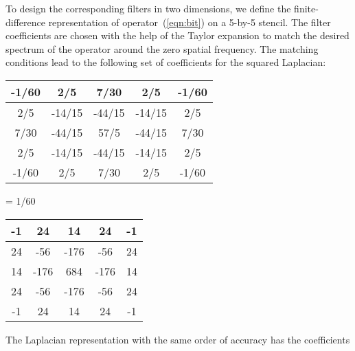 


To design the corresponding filters in two dimensions, we define the
finite-difference representation of operator~(\ref{eqn:bit}) on a
5-by-5 stencil. The filter coefficients are chosen with the help of
the Taylor expansion to match the desired spectrum of the operator
around the zero spatial frequency.  The matching conditions lead to
the following set of coefficients for the squared Laplacian:
\begin{center}
\begin{tabular}{|c|c|c|c|c|}
\hline 
-1/60 & 2/5 & 7/30 & 2/5 & -1/60 \\
\hline
2/5 & -14/15 & -44/15 & -14/15 & 2/5 \\
\hline
7/30 & -44/15 & 57/5 & -44/15 & 7/30 \\
\hline
2/5 & -14/15 & -44/15 & -14/15 & 2/5 \\
\hline
-1/60 & 2/5 & 7/30 & 2/5 & -1/60 \\
\hline
\end{tabular}
= 1/60
\begin{tabular}{|c|c|c|c|c|}
\hline 
-1 & 24 & 14 & 24 & -1 \\
\hline
24 & -56 & -176 & -56 & 24 \\
\hline
14 & -176 & 684 & -176 & 14 \\
\hline
24 & -56 & -176 & -56 & 24 \\
\hline
-1 & 24 & 14 & 24 & -1 \\
\hline
\end{tabular}
\end{center}
The Laplacian representation with the same order of accuracy has the
coefficients
